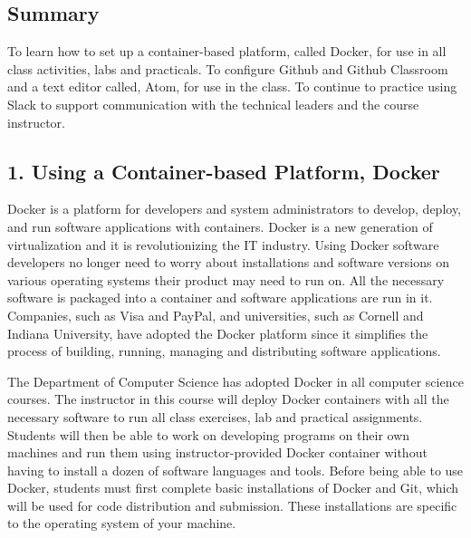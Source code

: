 
\newcommand{\command}[1]{``\lstinline{#1}''}
\newcommand{\program}[1]{\lstinline{#1}}
\newcommand{\channel}[1]{\lstinline{#1}}
\newcommand{\option}[1]{``{#1}''}
\newcommand{\step}[1]{``{#1}''}


\long{}



\subsection*{Summary}
To learn how to set up a container-based platform, called Docker, for use in all class activities, labs and practicals. To configure Github and Github Classroom and a text editor called, Atom, for use in the class. To continue to practice using Slack to support communication with the technical leaders and the course instructor.

\subsection*{1. Using a Container-based Platform, Docker}

Docker is a platform for developers and system administrators to develop, deploy, and run software applications with containers. Docker is a new generation of virtualization and it is revolutionizing the IT industry. Using Docker software developers no longer need to worry about installations and software versions on various operating systems their product may need to run on. All the necessary software is packaged into a container and software applications are run in it. Companies, such as Visa and PayPal, and universities, such as Cornell and Indiana University, have adopted the Docker platform since it simplifies the process of building, running, managing and distributing software applications. 

\noindent The Department of Computer Science has adopted Docker in all computer science courses. The instructor in this course will deploy Docker containers with all the necessary software to run all class exercises, lab and practical assignments. Students will then be able to work on developing programs on their own machines and run them using instructor-provided Docker container without having to install a dozen of software languages and tools. Before being able to use Docker, students must first complete basic installations of Docker and Git, which will be used for code distribution and submission. These installations are specific to the operating system of your machine. 


